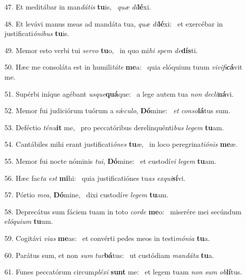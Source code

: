 47. Et meditábar in man\textit{dá}\textit{tis} \textbf{tu}is, \ast\  \textit{quæ} \textit{di}\textbf{lé}xi.\

48. Et levávi manus meas ad mandáta tua, \textit{quæ} \textit{di}\textbf{lé}xi: \ast\  et exercébar in justificati\textit{ó}\textit{ni}\textit{bus} \textbf{tu}is.\

49. Memor esto verbi tui \textit{ser}\textit{vo} \textbf{tu}o, \ast\  in quo mi\textit{hi} \textit{spem} \textit{de}\textbf{dís}ti.\

50. Hæc me consoláta est in humili\textit{tá}\textit{te} \textbf{me}a: \ast\  quia elóquium tuum \textit{vi}\textit{vi}\textit{fi}\textbf{cá}vit me.\

51. Supérbi iníque agébant \textit{us}\textit{que}\textbf{quá}que: \ast\  a lege autem tua \textit{non} \textit{de}\textit{cli}\textbf{ná}vi.\

52. Memor fui judiciórum tuórum a sǽ\textit{cu}\textit{lo}, \textbf{Dó}mine: \ast\  \textit{et} \textit{con}\textit{so}\textbf{lá}tus sum.\

53. Deféctio \textit{té}\textit{nu}\textbf{it} me, \ast\  pro peccatóribus derelinquénti\textit{bus} \textit{le}\textit{gem} \textbf{tu}am.\

54. Cantábiles mihi erant justificati\textit{ó}\textit{nes} \textbf{tu}æ, \ast\  in loco peregrina\textit{ti}\textit{ó}\textit{nis} \textbf{me}æ.\

55. Memor fui nocte nóminis \textit{tu}\textit{i}, \textbf{Dó}mine: \ast\  et custodí\textit{vi} \textit{le}\textit{gem} \textbf{tu}am.\

56. Hæc fac\textit{ta} \textit{est} \textbf{mi}hi: \ast\  quia justificatiónes tu\textit{as} \textit{ex}\textit{qui}\textbf{sí}vi.\

57. Pórtio \textit{me}\textit{a}, \textbf{Dó}mine, \ast\  dixi custodí\textit{re} \textit{le}\textit{gem} \textbf{tu}am.\

58. Deprecátus sum fáciem tuam in toto \textit{cor}\textit{de} \textbf{me}o: \ast\  miserére mei secúndum e\textit{ló}\textit{qui}\textit{um} \textbf{tu}um.\

59. Cogitávi \textit{vi}\textit{as} \textbf{me}as: \ast\  et convérti pedes meos in testi\textit{mó}\textit{ni}\textit{a} \textbf{tu}a.\

60. Parátus sum, et non \textit{sum} \textit{tur}\textbf{bá}tus: \ast\  ut custódiam \textit{man}\textit{dá}\textit{ta} \textbf{tu}a.\

61. Funes peccatórum circum\textit{plé}\textit{xi} \textbf{sunt} me: \ast\  et legem tuam \textit{non} \textit{sum} \textit{ob}\textbf{lí}tus.\

